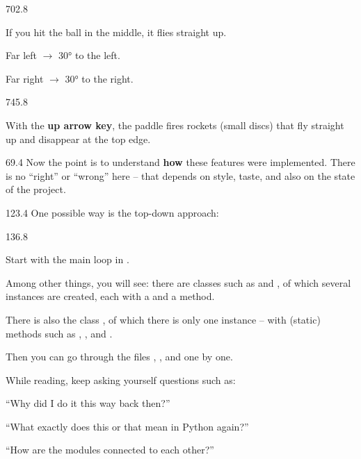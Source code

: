 \documentclass{aslab}
\begin{document}
\begin{region}[x=68.7,right=0,pitch=14.25]{702.8}
\begin{dashlist}
\item If you hit the ball in the middle, it flies straight up.
\item Far left $\rightarrow$ 30° to the left.
\item Far right $\rightarrow$ 30° to the right.
\end{dashlist}
\end{region}

\begin{region}[pitch=14.3]{745.8}
\begin{dashlist}
\item With the \textbf{up arrow key}, the paddle fires rockets (small discs)
  that fly straight up and disappear at the top edge.
\end{dashlist}
\end{region}

\nextpage
\begin{region}[pitch=14.3]{69.4}
Now the point is to understand \textbf{how} these features were implemented.
There is no ``right'' or ``wrong'' here -- that depends on style, taste, and
also on the state of the project.
\end{region}

\begin{region}{123.4}
One possible way is the top-down approach:
\end{region}

\begin{region}[pitch=13.37]{136.8}
\begin{tasks}
\item Start with the main loop in .
\item Among other things, you will see: there are classes such as 
  and , of which several instances are created, each with a
   and a  method.
\item There is also the class , of which there is only one
  instance -- with (static) methods such as , , and
  .
\item Then you can go through the files , , and
   one by one.
\item While reading, keep asking yourself questions such as:
  \begin{bullets}
  \item ``Why did I do it this way back then?''
  \item ``What exactly does this or that mean in Python again?''
  \item ``How are the modules connected to each other?''
  \end{bullets}
\end{tasks}
\end{region}
\end{document}
